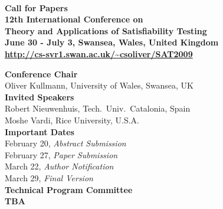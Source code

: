 \documentclass[10pt]{article}
\newcommand{\bthlight}[1]{{\color[rgb]{0.2,0.2,0.5}#1}}
\newcommand{\bhlight}[1]{{\color[rgb]{0.2,0.2,0.6}#1}}
\begin{document}
\pagestyle{empty}

\begin{center}
  {\bf
    \bthlight{{\huge SAT 2009}} \\[0.3cm]
    {\Large Call for Papers} \\[0.15cm]
    \bthlight{
      {\LARGE 12th International Conference on} \\[0.2cm]
      {\LARGE Theory and Applications of Satisfiability Testing} \\[0.15cm]
      {\Large June 30 - July 3, Swansea, Wales, United Kingdom}
    } \\[0.15cm]
    {\large \url{http://cs-svr1.swan.ac.uk/~csoliver/SAT2009}}
  }
\end{center}

\vspace*{-0.1cm} %
%
\begin{minipage}[t]{7.5cm}
{\large {\bf \bhlight{Conference Chair}}} \\[0.05cm]
{\small
  Oliver Kullmann, University of Wales, Swansea, UK\\[0.3cm]
}
{\large {\bf \bhlight{Invited Speakers}}} \\%
{\small
  Robert Nieuwenhuis, Tech.~Univ.~Catalonia, Spain\\
  Moshe Vardi, Rice University, U.S.A.\\[0.3cm]
}
{\large {\bf \bhlight{Important Dates}}} \\[0.05cm]
{\small
  February 20, {\em Abstract Submission} \\
  February 27, {\em Paper Submission} \\
  March 22, {\em Author Notification} \\
  March 29, {\em Final Version} \\[0.3cm]
}
{\large {\bf \bhlight{Technical Program Committee}}} \\[0.05cm]
{\small
  {\bf TBA}
}
\end{minipage}
\end{document}
